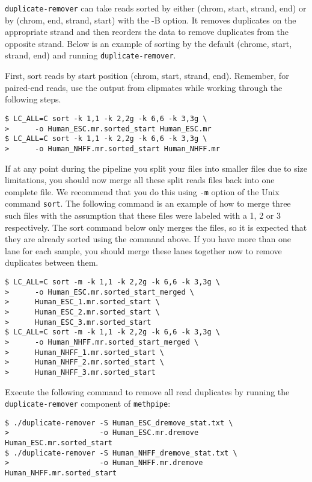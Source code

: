 \documentclass[10pt]{article}
\newcommand{\meth}{\texttt{methpipe}}
\newcommand{\prog}[1]{\texttt{#1}}
\newcommand{\op}[1]{\texttt{#1}}
\begin{document}
\prog{duplicate-remover} can take reads sorted by either (chrom, start, strand, end)
or by (chrom, end, strand, start) with the -B option.  It removes duplicates
on the appropriate strand and then reorders the data to remove duplicates from
the opposite strand.  Below is an example of sorting by the default (chrome, start,
strand, end) and running \prog{duplicate-remover}.

  First, sort reads by start position (chrom, start, strand,
  end). Remember, for paired-end reads, use the output from clipmates
  while working through the following steps.
\begin{verbatim}
$ LC_ALL=C sort -k 1,1 -k 2,2g -k 6,6 -k 3,3g \
>      -o Human_ESC.mr.sorted_start Human_ESC.mr
$ LC_ALL=C sort -k 1,1 -k 2,2g -k 6,6 -k 3,3g \
>      -o Human_NHFF.mr.sorted_start Human_NHFF.mr
\end{verbatim}
  If at any point during the pipeline you split your files into
  smaller files due to size limitations, you should now merge all
  these split reads files back into one complete file. We recommend
  that you do this using \op{-m} option of the Unix command
  \prog{sort}. The following command is an example of how to merge
  three such files with the assumption that these files were labeled
  with a 1, 2 or 3 respectively.  The sort command below only merges
  the files, so it is expected that they are already sorted using the
  command above.  If you have more than one lane for each sample,
  you should merge these lanes together now to remove duplicates
  between them.
\begin{verbatim}
$ LC_ALL=C sort -m -k 1,1 -k 2,2g -k 6,6 -k 3,3g \
>      -o Human_ESC.mr.sorted_start_merged \
>      Human_ESC_1.mr.sorted_start \
>      Human_ESC_2.mr.sorted_start \
>      Human_ESC_3.mr.sorted_start
$ LC_ALL=C sort -m -k 1,1 -k 2,2g -k 6,6 -k 3,3g \
>      -o Human_NHFF.mr.sorted_start_merged \
>      Human_NHFF_1.mr.sorted_start \
>      Human_NHFF_2.mr.sorted_start \
>      Human_NHFF_3.mr.sorted_start
\end{verbatim}
  Execute the following command to remove all read duplicates by running
  the \prog{duplicate-remover}
  component of \meth{}:
\begin{verbatim}
$ ./duplicate-remover -S Human_ESC_dremove_stat.txt \
>                     -o Human_ESC.mr.dremove Human_ESC.mr.sorted_start
$ ./duplicate-remover -S Human_NHFF_dremove_stat.txt \
>                     -o Human_NHFF.mr.dremove Human_NHFF.mr.sorted_start
\end{verbatim}
\end{document}
